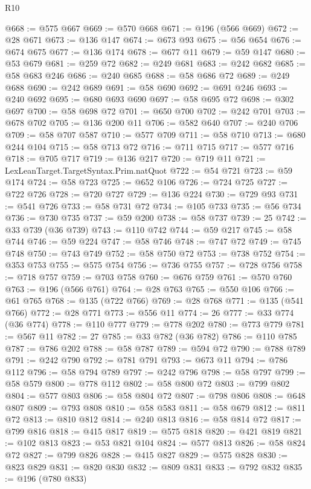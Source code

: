 \begin{lexlean}{R10}
\begin{coremodule}
@668 := @575 @667
@669 := @570 @668
@671 := @196 (@566 @669)
@672 := @28 @671
@673 := @136 @147
@674 := @673 @93
@675 := @56 @654
@676 := @674 @675
@677 := @136 @174
@678 := @677 @11
@679 := @59 @147
@680 := @53 @679
@681 := @259 @72
@682 := @249 @681
@683 := @242 @682
@685 := @58 @683 @246
@686 := @240 @685
@688 := @58 @686 @72
@689 := @249 @688
@690 := @242 @689
@691 := @58 @690
@692 := @691 @246
@693 := @240 @692
@695 := @680 @693 @690
@697 := @58 @695 @72
@698 := @302 @697
@700 := @58 @698 @72
@701 := @650 @700
@702 := @242 @701
@703 := @678 @702
@705 := @136 @200 @11
@706 := @582 @640
@707 := @240 @706
@709 := @58 @707 @587
@710 := @577 @709
@711 := @58 @710
@713 := @680 @244 @104
@715 := @58 @713 @72
@716 := @711 @715
@717 := @577 @716
@718 := @705 @717
@719 := @136 @217
@720 := @719 @11
@721 := LexLeanTarget.TargetSyntax.Prim.natQuot
@722 := @54 @721
@723 := @59 @174
@724 := @58 @723
@725 := @652 @106
@726 := @724 @725
@727 := @722 @726
@728 := @720 @727
@729 := @136 @224
@730 := @729 @93
@731 := @541 @726
@733 := @58 @731 @72
@734 := @105 @733
@735 := @56 @734
@736 := @730 @735
@737 := @59 @200
@738 := @58 @737
@739 := 25
@742 := @33 @739 (@36 @739)
@743 := @110 @742
@744 := @59 @217
@745 := @58 @744
@746 := @59 @224
@747 := @58 @746
@748 := @747 @72
@749 := @745 @748
@750 := @743 @749
@752 := @58 @750 @72
@753 := @738 @752
@754 := @353 @753
@755 := @575 @754
@756 := @736 @755
@757 := @728 @756
@758 := @718 @757
@759 := @703 @758
@760 := @676 @759
@761 := @570 @760
@763 := @196 (@566 @761)
@764 := @28 @763
@765 := @550 @106
@766 := @61 @765
@768 := @135 (@722 @766)
@769 := @28 @768
@771 := @135 (@541 @766)
@772 := @28 @771
@773 := @556 @11
@774 := 26
@777 := @33 @774 (@36 @774)
@778 := @110 @777
@779 := @778 @202
@780 := @773 @779
@781 := @567 @11
@782 := 27
@785 := @33 @782 (@36 @782)
@786 := @110 @785
@787 := @786 @202
@788 := @58 @787
@789 := @594 @72
@790 := @788 @789
@791 := @242 @790
@792 := @781 @791
@793 := @673 @11
@794 := @786 @112
@796 := @58 @794 @789
@797 := @242 @796
@798 := @58 @797
@799 := @58 @579
@800 := @778 @112
@802 := @58 @800 @72
@803 := @799 @802
@804 := @577 @803
@806 := @58 @804 @72
@807 := @798 @806
@808 := @648 @807
@809 := @793 @808
@810 := @58 @583
@811 := @58 @679
@812 := @811 @72
@813 := @810 @812
@814 := @240 @813
@816 := @58 @814 @72
@817 := @799 @816
@818 := @415 @817
@819 := @575 @818
@820 := @421 @819
@821 := @102 @813
@823 := @53 @821 @104
@824 := @577 @813
@826 := @58 @824 @72
@827 := @799 @826
@828 := @415 @827
@829 := @575 @828
@830 := @823 @829
@831 := @820 @830
@832 := @809 @831
@833 := @792 @832
@835 := @196 (@780 @833)

\end{coremodule}
\end{lexlean}

